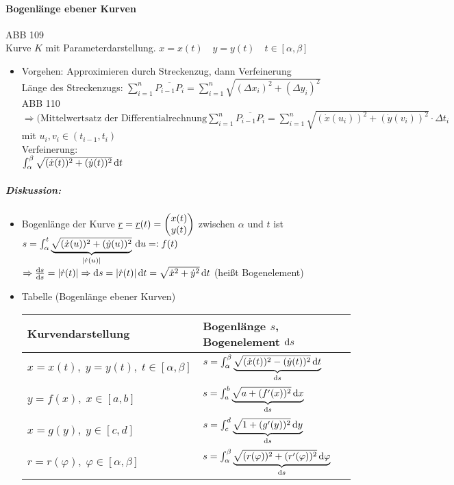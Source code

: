 \paragraph{Bogenlänge ebener Kurven}\parskp
ABB 109\\
Kurve $K$ mit Parameterdarstellung. $x=x(t) \quad y = y(t) \quad t \in [\alpha, \beta]$
\begin{itemize}
\item Vorgehen: Approximieren durch Streckenzug, dann Verfeinerung\\
Länge des Streckenzugs: $\sum_{i=1}^n \overline{P_{i-1}P_i}=\sum_{i=1}^n \sqrt{(\Delta x_i)^2+(\Delta y_i)^2}$\\
ABB 110\\
$\Rightarrow \text{(Mittelwertsatz der Differentialrechnung} \sum_{i=1}^n \overline{P_{i-1}P_i}= \sum_{i=1}^n \sqrt{(\dot{x}(u_i))^2 + (\dot{y}(v_i))^2}\cdot \Delta t_i$\\
mit $u_i, v_i\in (t_{i-1},t_i)$\\
Verfeinerung:\\
$\int_{\alpha}^{\beta} \sqrt{(\dot{x}(t))^2 + (\dot{y}(t))^2}\,\mathrm{d}t$
\end{itemize}
\subparagraph{Diskussion:}
\begin{itemize}
\item Bogenlänge der Kurve $\underline{r} = \underline{r}(t) = \begin{pmatrix}x(t) \\ y(t)\end{pmatrix}$ zwischen $\alpha$ und $t$ ist\\
$s=\int_{\alpha}^t \underbrace{\sqrt{(\dot{x}(u))^2 + (\dot{y}(u))^2}}_{|\dot{r}(u)|}\,\mathrm{d}u =: f(t)$\\
$\Rightarrow \frac{\mathrm{d}s}{\mathrm{d}s}= |\dot{r}(t)| \Rightarrow \mathrm{d}s=|\dot{r}(t)| \,\mathrm{d}t=\sqrt{\dot{x}^2+\dot{y}^2}\,\mathrm{d}t$ (heißt Bogenelement)
\item Tabelle (Bogenlänge ebener Kurven)\\
\begin{tabular}{l | l}
Kurvendarstellung & Bogenlänge $s$, Bogenelement $\mathrm{d}s$\\ 
\hline
$x=x(t),\; y=y(t),\; t \in [\alpha,\beta]$ & $s= \int_{\alpha}^{\beta} \underbrace{\sqrt{(\dot{x}(t))^2-(\dot{y}(t))^2}\,\mathrm{d}t}_{\mathrm{d}s}$\\
$y =f(x),\; x\in [a,b]$ & $s=\int_a^b\underbrace{\sqrt{a+(f'(x))^2}\,\mathrm{d}x}_{\mathrm{d}s}$\\
$x= g(y), \; y \in [c,d] $ & $s=\int_c^d\underbrace{\sqrt{1+(g'(y))^2}\,\mathrm{d}y}_{\mathrm{d}s}$\\
$r=r(\varphi), \; \varphi\in [\alpha, \beta]$ & $s=\int_{\alpha}^{\beta}\underbrace{\sqrt{(r(\varphi))^2+(r'(\varphi))^2}\,\mathrm{d}\varphi}_{\mathrm{d}s}$
\end{tabular}
\end{itemize}
